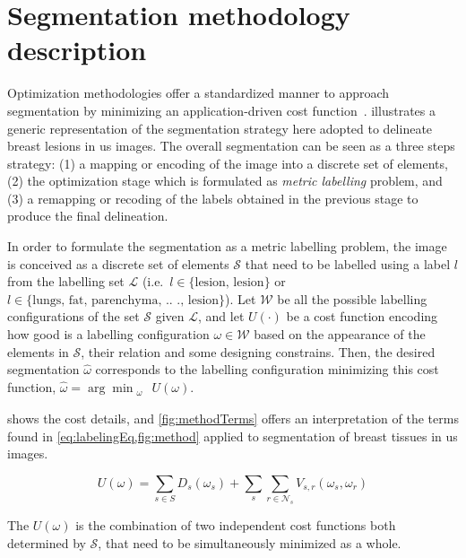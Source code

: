 \graphicspath{ {./content/method/figures/} }

\section{Segmentation methodology description} 

Optimization methodologies offer a standardized manner to approach segmentation by minimizing an application-driven cost function~\cite{cremers2007review}.
 illustrates a generic representation of the segmentation strategy here adopted to delineate breast lesions in \ac{us} images. 
The overall segmentation can be seen as a three steps strategy: (1) a mapping or encoding of the image into a discrete set of elements, (2) the optimization stage which is formulated as \emph{metric labelling} problem, and (3) a remapping or recoding of the labels obtained in the previous stage to produce the final delineation. 

In order to formulate the segmentation as a metric labelling problem, the image is conceived as a discrete set of elements $\mathcal{S}$ that need to be labelled using a label $l$ from the labelling set $\mathcal{L}$ (i.e.\, $l \in \text{\{lesion, lesion\}}$ or $l \in \text{\{lungs, fat, parenchyma, .. ., lesion\}}$).
Let $\mathcal{W}$ be all the possible labelling configurations of the set $\mathcal{S}$ given $\mathcal{L}$, and let $U(\cdot)$ be a cost function encoding how good is a labelling configuration $\omega \in \mathcal{W}$ based on the appearance of the elements in $\mathcal{S}$, their relation and some designing constrains.
Then, the desired segmentation $\hat{\omega}$ corresponds to the labelling configuration minimizing this cost function, $\displaystyle \hat{\omega} = \arg \min_{\substack{\omega}} \,U(\omega)$. 

 shows the cost details, and \cref{fig:methodTerms} offers an interpretation of the terms found in \cref{eq:labelingEq,fig:method} applied to segmentation of breast tissues in \ac{us} images.

\begin{equation}
  U(\omega) = \sum_{s\in S} D_s(\omega_s) + \sum_{s}\sum_{r \in \mathcal{N}_{s}} V_{s,r}(\omega_s,\omega_r)
  \label{eq:labelingEq}
\end{equation}

The $U(\omega)$ is the combination of two independent cost functions both determined by $\mathcal{S}$, that need to be simultaneously minimized as a whole.

